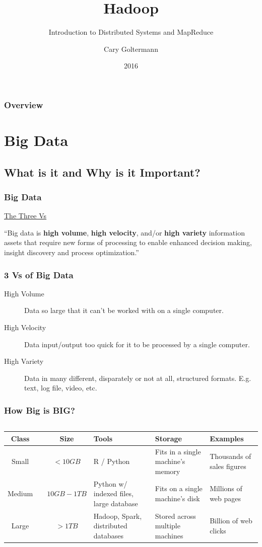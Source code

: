 \documentclass{beamer}
\title{Hadoop}
\subtitle{Introduction to Distributed Systems and MapReduce}
\author{Cary Goltermann}
\institute{Galvanize}
\date{2016}
\begin{document}
 
\frame{\titlepage}
 
\begin{frame}
  \frametitle{Overview}
  \tableofcontents[]
\end{frame}

\section{Big Data}
\subsection{What is it and Why is it Important?}
\begin{frame}
  \frametitle{Big Data}
  \centering
  \underline{\LARGE The Three Vs}
  \vspace{6mm}
  \begin{block}{}
    {\large ``Big data is \textbf{high volume}, \textbf{high velocity}, and/or \textbf{high variety} information assets that require new forms of processing to enable enhanced decision making, insight discovery and process optimization.''}
    \vspace{5mm}
    \hspace*{}
  \end{block}
\end{frame}

\begin{frame}
  \frametitle{3 Vs of Big Data}
  \begin{description}
    \item [High Volume] Data so large that it can't be worked with on a single computer.
    \item [High Velocity] Data input/output too quick for it to be processed by a single computer.
    \item [High Variety] Data in many different, disparately or not at all, structured formats. E.g. text, log file, video, etc.
  \end{description}
\end{frame}

\begin{frame}
  \frametitle{How Big is BIG?}
  \begin{columns}
    \column{\dimexpr\paperwidth-10pt}
    \small
    \begin{tabulary}{\textwidth}{|CC|C|L|L|L|}
      \hline
      \textbf{Class} & &\textbf{Size} & \textbf{Tools} & \textbf{Storage} & \textbf{Examples} \\
      \hline
      Small & & $< 10 GB$ & R / Python & Fits in a single machine's memory & Thousands of sales figures \\ 
      \hline
      Medium & & $10 GB - 1 TB$ & Python w/ indexed files, large database & Fits on a single machine's disk & Millions of web pages \\ 
      \hline
      Large & & $ > 1 TB$ & Hadoop, Spark, distributed databases & Stored across multiple machines & Billion of web clicks \\ 
      \hline
    \end{tabulary}
  \end{columns}
\end{frame}
\end{document}
